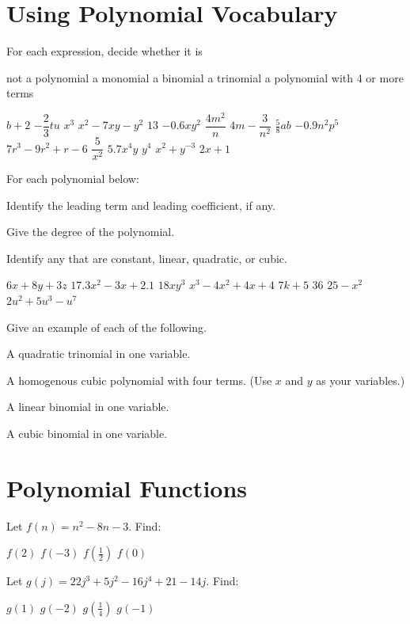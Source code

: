 \section*{Using Polynomial Vocabulary}
For each expression, decide whether it is
\begin{Nmenum}
\mitemxxx
{not a polynomial}
{a monomial}
{a binomial}
\mitemxxo
{a trinomial}
{a polynomial with 4 or more terms}
\end{Nmenum}
\begin{smenum}
\mitemxxxx
{$b+2$}
{$-\dfrac{2}{3}tu$}
{$x^3$}
{$x^2-7xy-y^2$}
\mitemxxxx
{$13$}
{$-0.6xy^2$}
{$\dfrac{4m^2}{n}$}
{$4m-\dfrac{3}{n^2}$}
\mitemxxxx
{$\frac{5}{8}ab$}
{$-0.9n^2p^5$}
{$7r^3-9r^2+r-6$}
{$\dfrac{5}{x^2}$}
\mitemxxxx
{$5.7x^4y$}
{$y^4$}
{$x^2+y^{-3}$}
{$2x+1$}
\end{smenum}
%
For each polynomial below:
\begin{clist}
\item Identify the leading term and leading coefficient, if any.
\item Give the degree of the polynomial.
\item Identify any that are constant, linear, quadratic, or cubic.
\end{clist}
\begin{smenum}
\mitemxxxx
{$6x+8y+3z$}
{$17.3x^2-3x+2.1$}
{$18xy^3$}
{$x^3-4x^2+4x+4$}
\mitemxxxx
{$7k+5$}
{$36$}
{$25-x^2$}
{$2u^2+5u^3-u^7$}
\end{smenum}
%
Give an example of each of the following.
\begin{senum}
\item A quadratic trinomial in one variable.
\item A homogenous cubic polynomial with four terms. (Use $x$ and $y$ as your variables.)
\item A linear binomial in one variable.
\item A cubic binomial in one variable.
\end{senum}

\section*{Polynomial Functions}
Let $f(n)=n^2-8n-3$.  Find:
\begin{smenum}
\mitemxxxx
{$f(2)$}
{$f(-3)$}
{$f(\frac{1}{2})$}
{$f(0)$}
\end{smenum}
Let $g(j)=22j^3+5j^2-16j^4+21-14j$.  Find:
\begin{smenum}
\mitemxxxx
{$g(1)$}
{$g(-2)$}
{$g(\frac{1}{4})$}
{$g(-1)$}
\end{smenum}

